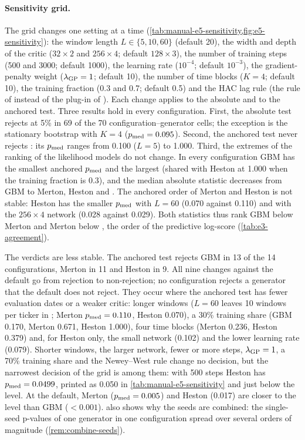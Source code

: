 \paragraph{Sensitivity grid.}
The grid changes one setting at a time (\cref{tab:manual-e5-sensitivity,fig:e5-sensitivity}): the
window length $L\in\{5,10,60\}$ (default 20), the width and depth of the critic ($32\times2$ and
$256\times4$; default $128\times3$), the number of training steps (500 and 3000; default 1000),
the learning rate ($10^{-4}$; default $10^{-3}$), the gradient-penalty weight ($\lambda_{\mathrm{GP}}=1$; default
10), the number of time blocks ($K=4$; default 10), the training fraction (0.3 and 0.7; default
0.5) and the HAC lag rule (the rule of \citet{newey1994automatic} instead of the plug-in of
\citet{andrews1991heteroskedasticity}). Each change applies to the absolute and to the anchored
test. Three results hold in every configuration. First, the absolute \WC{} test rejects at 5\% in
69 of the 70 configuration--generator cells; the exception is the stationary bootstrap with $K=4$
($p_{\mathrm{med}}=0.095$). Second, the anchored test never rejects \GARCHt{}: its $p_{\mathrm{med}}$ ranges from 0.100
($L=5$) to 1.000. Third, the extremes of the ranking of the likelihood models do not change. In
every configuration GBM has the smallest anchored $p_{\mathrm{med}}$ and \GARCHt{} the largest (shared with
Heston at 1.000 when the training fraction is 0.3), and the median absolute statistic decreases
from GBM to Merton, Heston and \GARCHt{}. The anchored order of Merton and Heston is not stable:
Heston has the smaller $p_{\mathrm{med}}$ with $L=60$ (0.070 against 0.110) and with the $256\times4$ network
(0.028 against 0.029). Both statistics thus rank GBM below Merton and Merton below \GARCHt, the
order of the predictive log-score (\cref{tab:e3-agreement}).

The \BAD{} verdicts are less stable. The anchored test rejects GBM in 13 of the 14
configurations, Merton in 11 and Heston in 9. All nine changes against the default go from
rejection to non-rejection; no configuration rejects a generator that the default does not
reject. They occur where the anchored test has fewer evaluation dates or a weaker critic: longer
windows ($L=60$ leaves 10 windows per ticker in \TEST; Merton $p_{\mathrm{med}}=0.110$, Heston 0.070), a
30\% training share (GBM 0.170, Merton 0.671, Heston 1.000), four time blocks (Merton 0.236,
Heston 0.379) and, for Heston only, the small network (0.102) and the lower learning rate
(0.079). Shorter windows, the larger network, fewer or more steps, $\lambda_{\mathrm{GP}}=1$, a 70\% training
share and the Newey--West rule change no decision, but the narrowest decision of the grid is
among them: with 500 steps Heston has $p_{\mathrm{med}}=0.0499$, printed as 0.050 in
\cref{tab:manual-e5-sensitivity} and just below the level. At the default, Merton ($p_{\mathrm{med}}=0.005$) and
Heston (0.017) are closer to the level than GBM ($<0.001$).  also shows
why the seeds are combined: the single-seed p-values of one generator in one configuration
spread over several orders of magnitude (\cref{rem:combine-seeds}).

